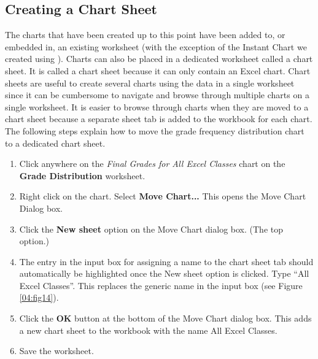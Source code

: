 \subsection{Creating a Chart Sheet}

The charts that have been created up to this point have been added to, or embedded in, an existing worksheet (with the exception of the Instant Chart we created using ). Charts can also be placed in a dedicated worksheet called a chart sheet. It is called a chart sheet because it can only contain an Excel chart. Chart sheets are useful to create several charts using the data in a single worksheet since it can be cumbersome to navigate and browse through multiple charts on a single worksheet. It is easier to browse through charts when they are moved to a chart sheet because a separate sheet tab is added to the workbook for each chart. The following steps explain how to move the grade frequency distribution chart to a dedicated chart sheet.

\begin{enumerate}
	\item Click anywhere on the \textit{Final Grades for All Excel Classes} chart on the \textbf{Grade Distribution} worksheet.
	\item Right click on the chart. Select \textbf{Move Chart...} This opens the Move Chart Dialog box.
	\item Click the \textbf{New sheet} option on the Move Chart dialog box. (The top option.)
	\item The entry in the input box for assigning a name to the chart sheet tab should automatically be highlighted once the New sheet option is clicked. Type ``All Excel Classes''. This replaces the generic name in the input box (see Figure \ref{04:fig14}).
	\item Click the \textbf{OK} button at the bottom of the Move Chart dialog box. This adds a new chart sheet to the workbook with the name All Excel Classes.
	\item Save the worksheet.
\end{enumerate}

